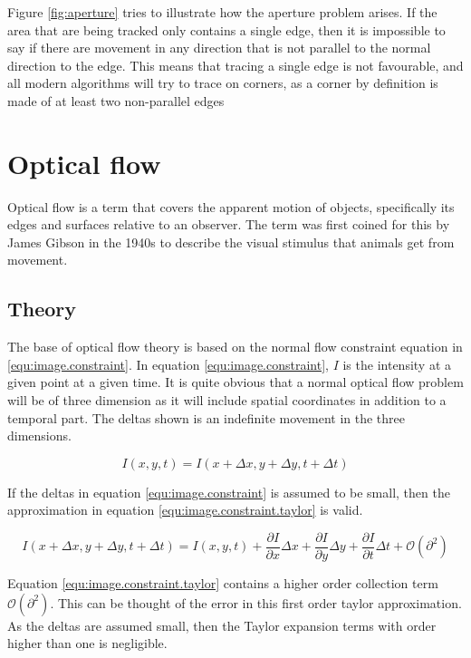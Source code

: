Figure \vref{fig:aperture} tries to illustrate how the aperture problem arises. If the area that are being tracked 
only contains a single edge, then it is impossible to say if there are movement in any direction that is not 
parallel to the normal direction to the edge. This means that tracing a single edge is not favourable, and all 
modern algorithms will try to trace on corners, as a corner by definition is made of at least two non-parallel edges 

\section{Optical flow}
Optical flow is a term that covers the apparent motion of objects, specifically its edges and surfaces 
relative to an observer. The term was first coined for this by James Gibson in the 1940s 
to describe the visual stimulus that animals get from movement\citet{gibson50}.


\subsection{Theory}
The base of optical flow theory is based on the normal flow constraint equation in \eqref{equ:image.constraint}. In equation \eqref{equ:image.constraint}, $I$ is the intensity
at a given point at a given time. It is quite obvious that a normal optical flow problem will be of three dimension as it will include spatial coordinates in addition
to a temporal part. The deltas shown is an indefinite movement in the three dimensions.


\begin{equation}\label{equ:image.constraint}
	I(x,y,t) = I(x + \Delta x, y+ \Delta y, t + \Delta t)
\end{equation}

If the deltas in equation \eqref{equ:image.constraint} is assumed to be small, then the approximation in equation \eqref{equ:image.constraint.taylor} is valid.

\begin{equation}\label{equ:image.constraint.taylor}
	I(x + \Delta x, y+ \Delta y, t + \Delta t) = I(x,y,t) + \frac{\partial I}{\partial x} \Delta x + 
		\frac{\partial I}{\partial y} \Delta y + \frac{\partial I}{\partial t} \Delta t + \mathcal{O}(\partial^2)
\end{equation}

Equation \eqref{equ:image.constraint.taylor} contains a higher order collection term $\mathcal{O}(\partial^2)$. This can be thought of the error in this first order taylor approximation. As
the deltas are assumed small, then the Taylor expansion terms with order higher than one is negligible. 

